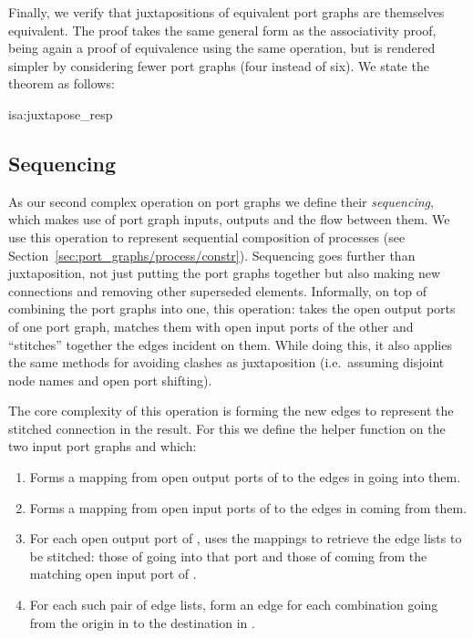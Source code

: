 \documentclass[class=smolathesis,crop=false]{standalone}
\begin{document}
Finally, we verify that juxtapositions of equivalent port graphs are themselves equivalent.
The proof takes the same general form as the associativity proof, being again a proof of equivalence using the same operation, but is rendered simpler by considering fewer port graphs (four instead of six).
We state the theorem as follows:
\begin{isalemma}{isa:juxtapose_resp}
  
\end{isalemma}

\subsection{Sequencing}
\label{sec:port_graphs/mech/seq}

As our second complex operation on port graphs we define their \emph{sequencing}, which makes use of port graph inputs, outputs and the flow between them.
We use this operation to represent sequential composition of processes (see Section~\ref{sec:port_graphs/process/constr}).
Sequencing goes further than juxtaposition, not just putting the port graphs together but also making new connections and removing other superseded elements.
Informally, on top of combining the port graphs into one, this operation: takes the open output ports of one port graph, matches them with open input ports of the other and ``stitches'' together the edges incident on them.
While doing this, it also applies the same methods for avoiding clashes as juxtaposition (i.e.\ assuming disjoint node names and open port shifting).

The core complexity of this operation is forming the new edges to represent the stitched connection in the result.
For this we define the helper function  on the two input port graphs  and  which:
\begin{enumerate}
  \item Forms a mapping from open output ports of  to the edges in  going into them.
  \item Forms a mapping from open input ports of  to the edges in  coming from them.
  \item For each open output port of , uses the mappings to retrieve the edge lists to be stitched: those of  going into that port and those of  coming from the matching open input port of .
  \item For each such pair of edge lists, form an edge for each combination going from the origin in  to the destination in .
\end{enumerate}
\end{document}
